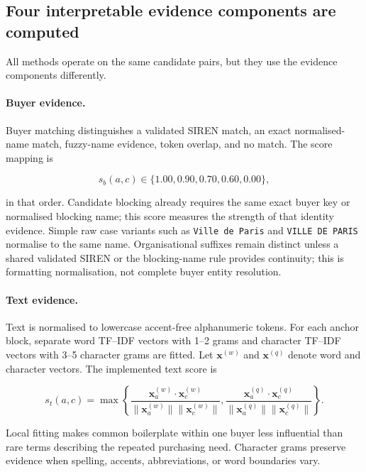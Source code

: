 \documentclass[11pt,a4paper]{article}
\newcommand{\code}[1]{\texttt{\small #1}}
\begin{document}
\subsection{Four interpretable evidence components are computed}

All methods operate on the same candidate pairs, but they use the evidence
components differently.

\paragraph{Buyer evidence.}
Buyer matching distinguishes a validated SIREN match, an exact normalised-name
match, fuzzy-name evidence, token overlap, and no match. The score mapping is

\begin{equation}
s_b(a,c) \in \{1.00,0.90,0.70,0.60,0.00\},
\end{equation}

in that order. Candidate blocking already requires the same exact buyer key or
normalised blocking name; this score measures the strength of that identity evidence.
Simple raw case variants such as \code{Ville de Paris} and \code{VILLE DE PARIS}
normalise to the same name. Organisational suffixes remain distinct unless a shared
validated SIREN or the blocking-name rule provides continuity; this is formatting
normalisation, not complete buyer entity resolution.

\paragraph{Text evidence.}
Text is normalised to lowercase accent-free alphanumeric tokens. For each anchor
block, separate word TF--IDF vectors with 1--2 grams and character TF--IDF vectors
with 3--5 character grams are fitted. Let $\mathbf{x}^{(w)}$ and
$\mathbf{x}^{(q)}$ denote word and character vectors. The implemented text score is

\begin{equation}
s_t(a,c)=\max\left\{
\frac{\mathbf{x}^{(w)}_a\cdot\mathbf{x}^{(w)}_c}
{\lVert\mathbf{x}^{(w)}_a\rVert\lVert\mathbf{x}^{(w)}_c\rVert},
\frac{\mathbf{x}^{(q)}_a\cdot\mathbf{x}^{(q)}_c}
{\lVert\mathbf{x}^{(q)}_a\rVert\lVert\mathbf{x}^{(q)}_c\rVert}
\right\}.
\end{equation}

Local fitting makes common boilerplate within one buyer less influential than rare
terms describing the repeated purchasing need. Character grams preserve evidence
when spelling, accents, abbreviations, or word boundaries vary.
\end{document}
